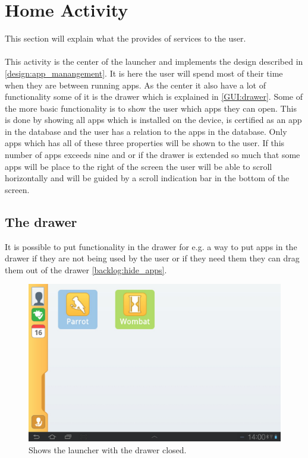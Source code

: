 \section{Home Activity}
This section will explain what the  provides of services to the user.\\\\

This activity is the center of the launcher and implements the design described in \autoref{design:app_manangement}. It is here the user will spend most of their time when they are between running apps. As the center it also have a lot of functionality some of it is the drawer which is explained in \autoref{GUI:drawer}. 
Some of the more basic functionality is to show the user which apps they can open. This is done by showing all apps which is installed on the device, is certified as an app in the database and the user has a relation to the apps in the database. Only apps which has all of these three properties will be shown to the user. If this number of apps exceeds nine and or if the drawer is extended so much that some apps will be place to the right of the screen the user will be able to scroll horizontally and will be guided by a scroll indication bar in the bottom of the screen.

\subsection{The drawer}
It is possible to put functionality in the drawer for e.g. a way to put apps in the drawer if they are not being used by the user or if they need them they can drag them out of the drawer \autoref{backlog:hide_apps}.

\begin{figure}[h!]
	\centering
	\includegraphics[scale=0.2]{gfx/home-activity_closed}
	\caption{Shows the launcher with the drawer closed.}
	\label{fig:home-activity_closed}
\end{figure}


